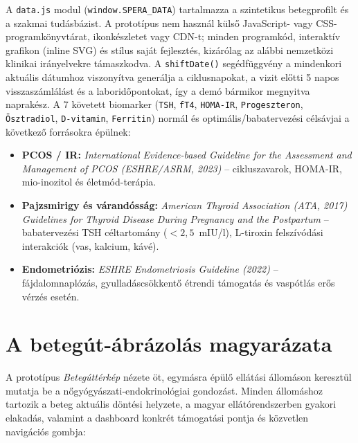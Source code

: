 \documentclass[10pt,a4paper]{article}
\begin{document}
A \texttt{data.js} modul (\texttt{window.SPERA\_DATA}) tartalmazza a szintetikus betegprofilt és a szakmai tudásbázist. A prototípus nem használ külső JavaScript- vagy CSS-programkönyvtárat, ikonkészletet vagy CDN-t; minden programkód, interaktív grafikon (inline SVG) és stílus saját fejlesztés, kizárólag az alábbi nemzetközi klinikai irányelvekre támaszkodva. A \texttt{shiftDate()} segédfüggvény a mindenkori aktuális dátumhoz viszonyítva generálja a ciklusnapokat, a vizit előtti 5 napos visszaszámlálást és a laboridőpontokat, így a demó bármikor megnyitva naprakész. A 7 követett biomarker (\texttt{TSH}, \texttt{fT4}, \texttt{HOMA-IR}, \texttt{Progeszteron}, \texttt{Ösztradiol}, \texttt{D-vitamin}, \texttt{Ferritin}) normál és optimális/babatervezési célsávjai a következő forrásokra épülnek:
\begin{itemize}
  \item \textbf{PCOS / IR:} \textit{International Evidence-based Guideline for the Assessment and Management of PCOS (ESHRE/ASRM, 2023)} -- cikluszavarok, HOMA-IR, mio-inozitol és életmód-terápia.
  \item \textbf{Pajzsmirigy és várandósság:} \textit{American Thyroid Association (ATA, 2017) Guidelines for Thyroid Disease During Pregnancy and the Postpartum} -- babatervezési TSH céltartomány ($<2{,}5$~mIU/l), L-tiroxin felszívódási interakciók (vas, kalcium, kávé).
  \item \textbf{Endometriózis:} \textit{ESHRE Endometriosis Guideline (2022)} -- fájdalomnaplózás, gyulladáscsökkentő étrendi támogatás és vaspótlás erős vérzés esetén.
\end{itemize}

\section{A betegút-ábrázolás magyarázata}

A prototípus \textit{Betegúttérkép} nézete öt, egymásra épülő ellátási állomáson keresztül mutatja be a nőgyógyászati-endokrinológiai gondozást. Minden állomáshoz tartozik a beteg aktuális döntési helyzete, a magyar ellátórendszerben gyakori elakadás, valamint a dashboard konkrét támogatási pontja és közvetlen navigációs gombja:
\end{document}

